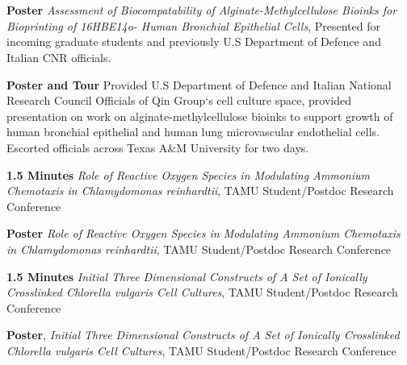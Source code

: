 \documentclass[11pt]{article}
\begin{document}
\section*{\color{secondary}{Presentations}}
        \begin{description}[noitemsep]
                \item [2024] {\textbf{Poster} \emph{Assessment of Biocompatability
                        of Alginate-Methylcellulose Bioinks for Bioprinting of 16HBE14o- 
                        Human Bronchial Epithelial Cells}, Presented for incoming
                        graduate students and previously U.S Department of Defence
                        and Italian CNR officials.
                        }
                \item [2024] {\textbf{Poster and Tour} Provided U.S Department of 
                        Defence and Italian National Research Council Officials of
                        Qin Group`s cell culture space, provided presentation
                        on work on alginate-methylcellulose bioinks to support
                        growth of human bronchial epithelial and human lung
                        microvascular endothelial cells. Escorted officials across
                        Texas A\&M University for two days.} 
                \item [2024] {\textbf{1.5 Minutes} \emph{Role of Reactive Oxygen
                        Species in Modulating Ammonium Chemotaxis in 
                        Chlamydomonas reinhardtii}, TAMU Student/Postdoc
                        Research Conference}
                \item [2024] {\textbf{Poster} \emph{Role of Reactive
                        Oxygen Species in Modulating Ammonium
                        Chemotaxis in Chlamydomonas reinhardtii},
                        TAMU Student/Postdoc Research Conference}
                \item [2023] {\textbf{1.5 Minutes} \emph{Initial Three
                        Dimensional Constructs of A Set of Ionically
                        Crosslinked Chlorella vulgaris Cell Cultures},
                        TAMU Student/Postdoc Research
                        Conference}
                \item [2023] {\textbf{Poster}, \emph{Initial Three Dimensional
                        Constructs of A Set of Ionically
                        Crosslinked Chlorella vulgaris Cell
                        Cultures}, TAMU Student/Postdoc Research 
                        Conference} 
        \end{description}
\end{document}
